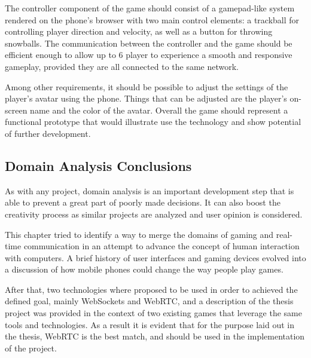 The controller component of the game should consist of a gamepad-like system
rendered on the phone's browser with two main control elements: a trackball for
controlling player direction and velocity, as well as a button for throwing
snowballs. The communication between the controller and the game should be
efficient enough to allow up to 6 player to experience a smooth and responsive
gameplay, provided they are all connected to the same network.

Among other requirements, it should be possible to adjust the settings of
the player's avatar using the phone. Things that can be adjusted are the
player's on-screen name and the color of the avatar. Overall the game should
represent a functional prototype that would illustrate use the technology and
show potential of further development.


\subsection{Domain Analysis Conclusions}

As with any project, domain analysis is an important development step that is
able to prevent a great part of poorly made decisions. It can also boost the
creativity process as similar projects are analyzed and user opinion is
considered.

This chapter tried to identify a way to merge the domains of gaming and real-
time communication in an attempt to advance the concept of human interaction
with computers. A brief history of user interfaces and gaming devices evolved
into a discussion of how mobile phones could change the way people play games.

After that, two technologies where proposed to be used in order to achieved the
defined goal, mainly WebSockets and WebRTC, and a description of the thesis
project was provided in the context of two existing games that leverage the same
tools and technologies. As a result it is evident that for the purpose laid out
in the thesis, WebRTC is the best match, and should be used in the
implementation of the project.


\clearpage
